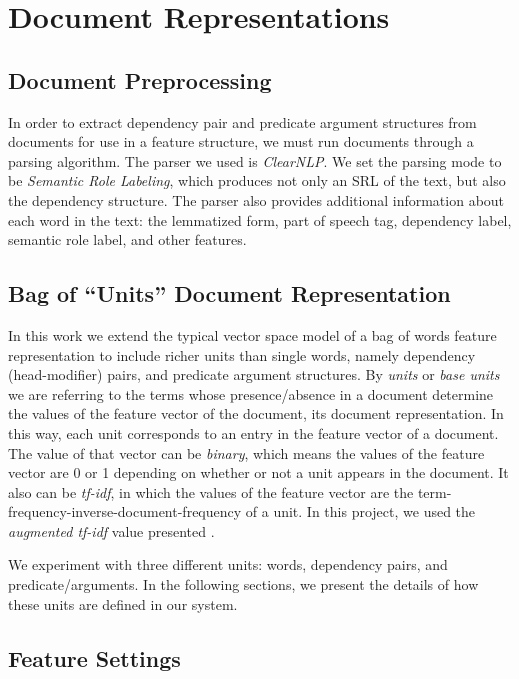 \documentclass[11pt]{article}
\begin{document}
\section{Document Representations}


\subsection{Document Preprocessing}

In order to extract dependency pair and predicate argument structures from documents for use in a feature structure, we must run documents through a parsing algorithm. The parser we used is \emph{ClearNLP}. We set the parsing mode to be \emph{Semantic Role Labeling}, which produces not only an SRL of the text, but also the dependency structure. The parser also provides additional information about each word in the text: the lemmatized form, part of speech tag, dependency label, semantic role label, and other features. 

\subsection{Bag of ``Units'' Document Representation}

In this work we extend the typical vector space model of a bag of words feature representation to include richer units than single words, namely dependency (head-modifier) pairs, and predicate argument structures. By \emph{units} or \emph{base units} we are referring to the terms whose presence/absence in a document determine the values of the feature vector of the document, its document representation. In this way, each unit corresponds to an entry in the feature vector of a document. The value of that vector can be \textit{binary}, which means the values of the feature vector are 0 or 1 depending on whether or not a unit appears in the document. It  also can be \textit{tf-idf}, in which the values of the feature vector are the term-frequency-inverse-document-frequency of a unit. In this project, we used the \textit{augmented tf-idf} value presented \cite{Polettini2004}.

We experiment with three different units: words, dependency pairs, and predicate/arguments. In the following sections, we present the details of how these units are defined in our system.

\subsection{Feature Settings}
\end{document}
